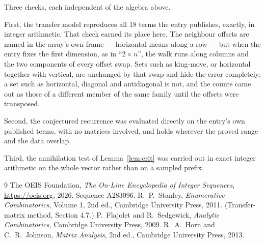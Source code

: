 \documentclass[11pt,a4paper]{article}
\theoremstyle{plain}
\theoremstyle{definition}
\begin{document}
Three checks, each independent of the algebra above.

First, the transfer model reproduces all $18$ terms the entry publishes, exactly, in
integer arithmetic. That check earned its place here. The neighbour offsets are named in the
array's own frame --- horizontal means along a row --- but when the entry fixes the first
dimension, as in ``$2\times n$'', the walk runs along columns and the two components of every
offset swap. Sets such as king-move, or horizontal together with vertical, are unchanged by
that swap and hide the error completely; a set such as horizontal, diagonal and antidiagonal
is not, and the counts came out as those of a different member of the same family until the
offsets were transposed.

Second, the conjectured recurrence was evaluated directly on the entry's own published terms,
with no matrices involved, and holds wherever the proved range and the data overlap.

Third, the annihilation test of Lemma~\ref{lem:crit} was carried out in exact integer
arithmetic on the whole vector rather than on a sampled prefix.

\begin{thebibliography}{9}
 The OEIS Foundation, \emph{The On-Line Encyclopedia of Integer
Sequences}, \url{https://oeis.org}, 2026. Sequence A283096.
 R.~P.~Stanley, \emph{Enumerative Combinatorics}, Volume 1, 2nd ed.,
Cambridge University Press, 2011. (Transfer-matrix method, Section 4.7.)
 P.~Flajolet and R.~Sedgewick, \emph{Analytic Combinatorics}, Cambridge
University Press, 2009.
 R.~A.~Horn and C.~R.~Johnson, \emph{Matrix Analysis}, 2nd ed., Cambridge
University Press, 2013.
\end{thebibliography}
\end{document}
